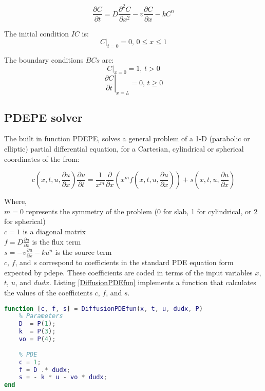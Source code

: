 \documentclass{article}
\begin{document}
$$ \frac{\partial C}{\partial t} = D \frac{\partial^2 C}{\partial x^2} - v \frac{\partial C}{\partial x} - k C^n $$

The initial condition $IC$ is:
$$ \left. C \right|_{t = 0} = 0 \textrm{, } 0 \leq x \leq 1 $$

The boundary conditions $BCs$ are:
$$ \left. C \right|_{x = 0} = 1 \textrm{, } t > 0 $$
$$ \left. \frac{\partial C}{\partial t} \right|_{x = L} = 0 \textrm{, } t \geq 0 $$

\subsection{PDEPE solver}

The built in function PDEPE, solves a general problem of a 1-D (parabolic or elliptic) partial differential equation, for a Cartesian, cylindrical or spherical coordinates of the from:

$$ c \left( x, t, u, \frac{\partial u}{\partial x} \right) \frac{\partial u}{\partial t} = \frac{1}{x^m} \frac{\partial}{\partial x} \left( x^m f \left( x, t, u, \frac{\partial u}{\partial x} \right) \right) + s \left( x, t, u, \frac{\partial u}{\partial x} \right) $$

Where, \\
$\displaystyle m = 0$ represents the symmetry of the problem (0 for slab, 1 for cylindrical, or 2 for spherical) \\
$\displaystyle c = 1$ is a diagonal matrix \\
$\displaystyle f = D \frac{\partial u}{\partial x}$ is the flux term\\
$\displaystyle s = - v \frac{\partial u}{\partial x} - k u^n$ is the source term \\
$c$, $f$, and $s$ correspond to coefficients in the standard PDE equation form expected by pdepe. These coefficients are coded in terms of the input variables $x$, $t$, $u$, and $dudx$. Listing \ref{DiffusionPDEfun} implements a function that calculates the values of the coefficients $c$, $f$, and $s$.

\begin{lstlisting}[language=Matlab, caption=PDE function for equations, label=DiffusionPDEfun]
function [c, f, s] = DiffusionPDEfun(x, t, u, dudx, P)
    % Parameters
    D  = P(1);
    k  = P(3);
    vo = P(4);
    
    % PDE
    c = 1;
    f = D .* dudx;
    s = - k * u - vo * dudx;
end
\end{lstlisting}
\end{document}
